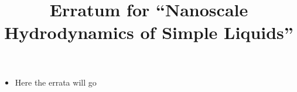 \documentclass{article}
\title{Erratum for ``Nanoscale Hydrodynamics of Simple Liquids''}
\date{}
\begin{document}
\maketitle

\begin{itemize}
\item Here the errata will go
\end{itemize}
\end{document}
